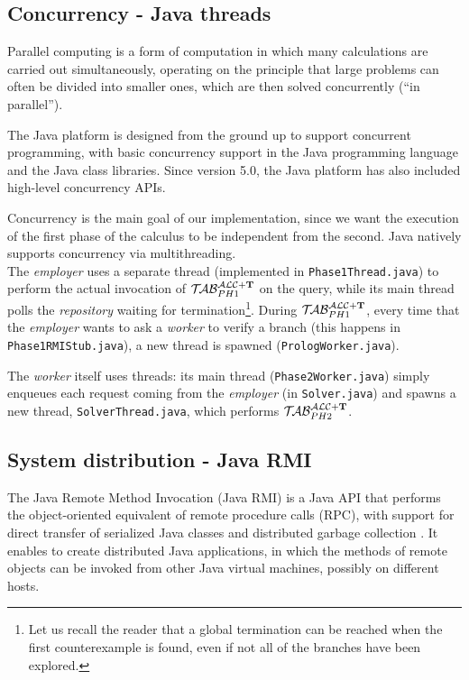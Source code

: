 \documentclass[a4paper, 11pt, oneside]{duthesis}
\newcommand{\tip}{{\bf T}}
\newcommand{\primo}{\mathrel{{\mathcal{T}\!\mathcal{AB}}}_{PH 1}^{\mathcal{ALC}+\mbox{\scriptsize $\tip$}}}
\newcommand{\secondo}{\mathrel{{\mathcal{T}\!\mathcal{AB}}}_{PH 2}^{\mathcal{ALC}+\mbox{\scriptsize $\tip$}}}
\begin{document}

\subsection{Concurrency - Java threads}
Parallel computing is a form of computation in which many calculations are carried out simultaneously, operating on the principle that large problems can often be divided into smaller ones, which are then solved concurrently (``in parallel'')\cite{Almasi:1989:HPC:160438}.

The Java platform is designed from the ground up to support concurrent programming, with basic concurrency support in the Java programming language and the Java class libraries. Since version 5.0, the Java platform has also included high-level concurrency APIs\cite{oracle_thread}.

Concurrency is the main goal of our implementation, since we want the execution of the first phase of the calculus to be independent from the second. Java natively supports concurrency via multithreading.\\

The \emph{employer} uses a separate thread (implemented in \verb$Phase1Thread.java$) to perform the actual invocation of $\primo$ on the query, while its main thread polls the \emph{repository} waiting for termination\footnote{Let us recall the reader that a global termination can be reached when the first counterexample is found, even if not all of the branches have been explored.}.
During $\primo$, every time that the \emph{employer} wants to ask a \emph{worker} to verify a branch (this happens in \verb$Phase1RMIStub.java$), a new thread is spawned (\verb$PrologWorker.java$).

The \emph{worker} itself uses threads: its main thread (\verb$Phase2Worker.java$) simply enqueues each request coming from the \emph{employer} (in \verb$Solver.java$) and spawns a new thread, \verb$SolverThread.java$, which performs $\secondo$.


\subsection{System distribution - Java RMI}

The Java Remote Method Invocation (Java RMI) is a Java API that performs the object-oriented equivalent of remote procedure calls (RPC), with support for direct transfer of serialized Java classes and distributed garbage collection \cite{wiki_rmi}.
It enables to create distributed Java applications, in which the methods of remote objects can be invoked from other Java virtual machines, possibly on different hosts\cite{oracle_rmi}.
\end{document}
